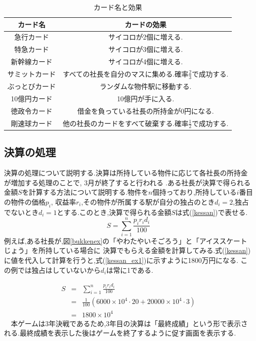 \documentclass[a4j]{jarticle}
\begin{document}
    \begin{table}[H]
        \caption{カード名と効果}
      \label{cardlist}
      \begin{center}
          \begin{tabular}{c|c}\hline
              カード名 & カードの効果 \\ \hline \hline
              急行カード & サイコロが2個に増える.\\
              特急カード & サイコロが3個に増える.\\
              新幹線カード & サイコロが4個に増える.\\
              サミットカード & すべての社長を自分のマスに集める.確率$\frac{2}{3}$で成功する.\\
              ぶっとびカード & ランダムな物件駅に移動する. \\
              10億円カード & 10億円が手に入る.\\
              徳政令カード & 借金を負っている社長の所持金が0円になる.\\
              剛速球カード & 他の社長のカードをすべて破棄する.確率$\frac{1}{2}$で成功する.\\ \hline
          \end{tabular}
      \end{center}
      \end{table}

      \subsection{決算の処理}
      決算の処理について説明する.決算は所持している物件に応じて各社長の所持金が増加する処理のことで, 3月が終了すると行われる
      .ある社長が決算で得られる金額$S$を計算する方法について説明する.物件を$n$個持っており,所持している$i$番目の物件の価格$p_i$,
      収益率$r_i$,その物件が所属する駅が自分の独占のとき$d_i=2$,独占でないとき$d_i=1$とする.このとき,決算で得られる金額$S$は式(\ref{kessan})で表せる.
      \begin{equation}
        S = \sum_{i=1}^{n} \frac{p_i r_i d_i}{100}
        \label{kessan}
      \end{equation}
      例えば,ある社長が,図\ref{bukkenex}の「やわたやいそごろう」と「アイススケートじょう」を所持している場合に
      決算でもらえる金額を計算してみる.式(\ref{kessan})に値を代入して計算を行うと,式(\ref{kessan_ex1})に示すように1800万円になる.
      この例では独占はしていないから$d_i$は常に1である.

      \begin{eqnarray}
        S &=& \sum_{i=1}^{n} \frac{p_i r_i d_i}{100} \\
          &=& \frac{1}{100} \left( 6000\times10^4 \cdot 20 + 20000\times10^4 \cdot 3 \right) \\
          &=& 1800 \times10^4
        \label{kessan_ex1}
      \end{eqnarray}    
      　本ゲームは3年決戦であるため,3年目の決算は「最終成績」という形で表示される.最終成績を表示した後はゲームを終了するように促す画面を表示する.
    
\end{document}
